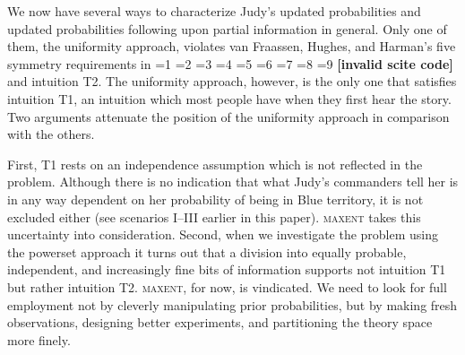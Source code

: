 \documentclass[smallextended]{svjour3}       %
\newcommand{\PageP}{p.~}
\newcommand{\PageP}{}
\newcommand{\scite}[3]{\ifnum#1=1\cite{#2}\else
\ifnum#1=2\cite[{\PageP}~#3]{#2}\else
\ifnum#1=3\cite[{\PageP}~#3]{#2}\else
\ifnum#1=4\cite{#2}\else
\ifnum#1=5\cite{#2}\else
\ifnum#1=6\cite[{\PageP}~#3]{#2}\else
\ifnum#1=7\cite{#2}\else
\ifnum#1=8\cite[{\PageP}~#3]{#2}\else
\ifnum#1=9\cite[{\PageP}~#3]{#2}\else
\textbf{[invalid scite code]}\fi\fi\fi\fi\fi\fi\fi\fi\fi}
\begin{document}
We now have several ways to characterize Judy's updated
probabilities and updated probabilities following upon partial
information in general. Only one of them, the uniformity approach,
violates van Fraassen, Hughes, and Harman's five symmetry requirements
in \scite{7}{fraassenetal86}{} and intuition T2. The uniformity
approach, however, is the only one that satisfies intuition T1, an
intuition which most people have when they first hear the story. Two
arguments attenuate the position of the uniformity approach in
comparison with the others. 

First, T1 rests on an independence assumption which is not reflected
in the problem. Although there is no indication that what Judy's
commanders tell her is in any way dependent on her probability of
being in Blue territory, it is not excluded either (see scenarios
I--III earlier in this paper). \textsc{maxent} takes this uncertainty
into consideration. Second, when we investigate the problem using the
powerset approach it turns out that a division into equally probable,
independent, and increasingly fine bits of information supports not
intuition T1 but rather intuition T2. \textsc{maxent}, for now, is
vindicated. We need to look for full employment not by cleverly
manipulating prior probabilities, but by making fresh observations,
designing better experiments, and partitioning the theory space more
finely.

%  


\end{document}
